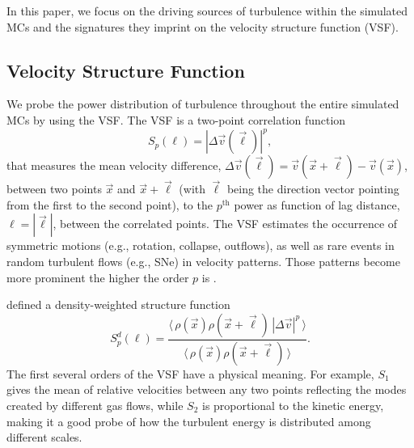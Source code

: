 In this paper, we focus on the driving sources of turbulence within the simulated MCs and the signatures they imprint on 
the velocity structure function (VSF).


\subsection{Velocity Structure Function}\label{methods:vsf}

We probe the power distribution of turbulence throughout the entire simulated MCs by using the VSF.
The VSF is a two-point correlation function 
\begin{equation}
	{S}_p (\ell) = |\Delta \vec{v} (\vec{\ell})|^p ,
    \label{equ:method:def_vsf}
\end{equation}
that measures the mean velocity difference, $\Delta \vec{v} (\vec{\ell}) = \vec{v}(\vec{x}+\vec{\ell}) - \vec{v}(\vec{x})$, between two points $\vec{x}$ and $\vec{x}+\vec{\ell}$ (with $\vec{\ell}$ being the direction vector pointing from the first to the second point), to the $p^\mathrm{th}$ power as function of lag distance, $\ell = |\vec{\ell}|$, between the correlated points.
The VSF estimates the occurrence of symmetric motions (e.g., rotation, collapse, outflows), as well as rare events in random turbulent flows (e.g., SNe) in velocity patterns.
Those patterns become more prominent the higher the order $p$ is \citep{Heyer2004}.

\citet{Padoan2016a} defined a density-weighted structure function
\begin{equation}
	{S}^d_p (\ell) = \frac{\langle \, \rho(\vec{x}) \rho(\vec{x}+\vec{\ell}) \, |\Delta \vec{v}|^p  \, \rangle}{\langle  \, \rho(\vec{x}) \rho(\vec{x}+\vec{\ell}) \, \rangle}.
    \label{equ:method:def_vsf_dw}
\end{equation}
          The first several orders of the VSF have 
a physical meaning. 
For example, $\mathit{S}_1$
     gives the mean of relative velocities between any two points 
reflecting the modes created by different gas flows, while
$\mathit{S}_2$ is proportional to the kinetic energy, making it a good probe of how the turbulent energy is
    distributed among 
different scales.

